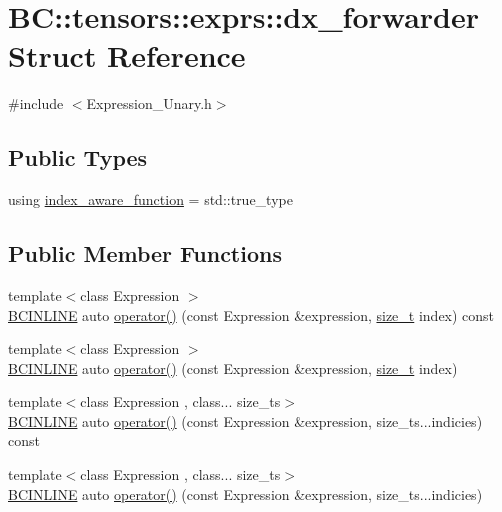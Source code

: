 \hypertarget{structBC_1_1tensors_1_1exprs_1_1dx__forwarder}{}\section{BC\+:\+:tensors\+:\+:exprs\+:\+:dx\+\_\+forwarder Struct Reference}
\label{structBC_1_1tensors_1_1exprs_1_1dx__forwarder}


{\ttfamily \#include $<$Expression\+\_\+\+Unary.\+h$>$}

\subsection*{Public Types}
\begin{DoxyCompactItemize}
\item 
using \hyperlink{structBC_1_1tensors_1_1exprs_1_1dx__forwarder_ac87f591e4c8f0290e391f7756e10e174}{index\+\_\+aware\+\_\+function} = std\+::true\+\_\+type
\end{DoxyCompactItemize}
\subsection*{Public Member Functions}
\begin{DoxyCompactItemize}
\item 
{\footnotesize template$<$class Expression $>$ }\\\hyperlink{BlackCat__Common_8h_a6699e8b0449da5c0fafb878e59c1d4b1}{B\+C\+I\+N\+L\+I\+NE} auto \hyperlink{structBC_1_1tensors_1_1exprs_1_1dx__forwarder_abe6a0afa1a6b3aa121a7d343d72a5f64}{operator()} (const Expression \&expression, \hyperlink{namespaceBC_a6007cbc4eeec401a037b558910a56173}{size\+\_\+t} index) const 
\item 
{\footnotesize template$<$class Expression $>$ }\\\hyperlink{BlackCat__Common_8h_a6699e8b0449da5c0fafb878e59c1d4b1}{B\+C\+I\+N\+L\+I\+NE} auto \hyperlink{structBC_1_1tensors_1_1exprs_1_1dx__forwarder_ae60b0efd56dc3aed7e00ad43a62349e7}{operator()} (const Expression \&expression, \hyperlink{namespaceBC_a6007cbc4eeec401a037b558910a56173}{size\+\_\+t} index)
\item 
{\footnotesize template$<$class Expression , class... size\+\_\+ts$>$ }\\\hyperlink{BlackCat__Common_8h_a6699e8b0449da5c0fafb878e59c1d4b1}{B\+C\+I\+N\+L\+I\+NE} auto \hyperlink{structBC_1_1tensors_1_1exprs_1_1dx__forwarder_a73a7e5c5ee659b63629d7d3ec0d6960e}{operator()} (const Expression \&expression, size\+\_\+ts...\+indicies) const 
\item 
{\footnotesize template$<$class Expression , class... size\+\_\+ts$>$ }\\\hyperlink{BlackCat__Common_8h_a6699e8b0449da5c0fafb878e59c1d4b1}{B\+C\+I\+N\+L\+I\+NE} auto \hyperlink{structBC_1_1tensors_1_1exprs_1_1dx__forwarder_a1a0cedb09193f7abd6caec3291881d5b}{operator()} (const Expression \&expression, size\+\_\+ts...\+indicies)
\end{DoxyCompactItemize}


